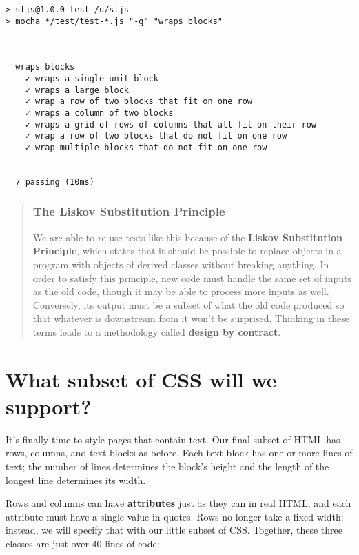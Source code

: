 \documentclass[krantzl]{krantz}
\newcommand{\glossref}[1]{\textbf{#1}}
\newenvironment{callout}{\savenotes\begin{tBox}\begin{quotation}\toggletrue{inbox}\renewcommand{\thempfootnote}{\arabic{footnote}}}{\end{quotation}\vspace{\baselineskip}\end{tBox}\togglefalse{inbox}\spewnotes}
\begin{document}
\begin{lstlisting}[frame=tblr,backgroundcolor=\color{black!5}]
> stjs@1.0.0 test /u/stjs
> mocha */test/test-*.js "-g" "wraps blocks"



  wraps blocks
    ✓ wraps a single unit block
    ✓ wraps a large block
    ✓ wrap a row of two blocks that fit on one row
    ✓ wraps a column of two blocks
    ✓ wraps a grid of rows of columns that all fit on their row
    ✓ wrap a row of two blocks that do not fit on one row
    ✓ wrap multiple blocks that do not fit on one row


  7 passing (10ms)
\end{lstlisting}


\begin{callout}


\subsubsection*{The Liskov Substitution Principle}


We are able to re-use tests like this because of
the \glossref{Liskov Substitution Principle},
which states that
it should be possible to replace objects in a program
with objects of derived classes
without breaking anything.
In order to satisfy this principle,
new code must handle the same set of inputs as the old code,
though it may be able to process more inputs as well.
Conversely,
its output must be a subset of what the old code produced
so that whatever is downstream from it won’t be surprised.
Thinking in these terms leads to a methodology called
\glossref{design by contract}.

\end{callout}

\section{What subset of CSS will we support?}\label{layout-engine-css}


It’s finally time to style pages that contain text.
Our final subset of HTML has rows, columns, and text blocks as before.
Each text block has one or more lines of text;
the number of lines determines the block’s height
and the length of the longest line determines its width.


Rows and columns can have \glossref{attributes} just as they can in real HTML,
and each attribute must have a single value in quotes.
Rows no longer take a fixed width:
instead,
we will specify that with our little subset of CSS.
Together,
these three classes are just over 40 lines of code:
\end{document}
